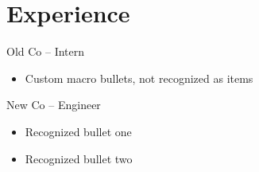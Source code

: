 \documentclass{article}
\newcommand{\resumeItem}[1]{\item #1}
\begin{document}
\section{Experience}
Old Co -- Intern
\begin{itemize}
\resumeItem{Custom macro bullets, not recognized as items}
\end{itemize}
New Co -- Engineer
\begin{itemize}
\item Recognized bullet one
\item Recognized bullet two
\end{itemize}
\end{document}
